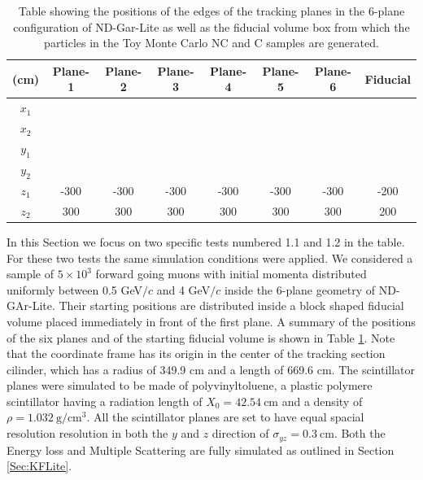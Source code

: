 \begin{table}[t]
    \centering
    \begin{tabular}{||c|c|c|c|c|c|c|c||}
        \hline
        (cm) &  Plane-1&  Plane-2&  Plane-3&  Plane-4&  Plane-5&  Plane-6& Fiducial\\
        \hline
        \hline
        $x_1$ &  &  &  &  &  &  & \\
        \hline
        $x_2$ &  &  &  &  &  &  & \\
        \hline
        $y_1$ &  &  &  &  &  &  & \\
        \hline
        $y_2$ &  &  &  &  &  &  & \\
        \hline
        $z_1$ &  -300&  -300&  -300&  -300&  -300&  -300& -200\\
        \hline
        $z_2$ &  300&  300&  300&  300&  300&  300& 200\\
        \hline
    \end{tabular}
    \caption{Table showing the positions of the edges of the tracking planes in the 6-plane configuration of ND-Gar-Lite as well as the fiducial volume box from which the particles in the Toy Monte Carlo NC and C samples are generated. }
    \label{tab:Lite dimentions}
\end{table}

In this Section we focus on two specific tests numbered 1.1 and 1.2 in the table. For these two tests the same simulation conditions were applied. We considered a sample of $5\times10^3$ forward going muons with initial momenta distributed uniformly between 0.5 GeV$/c$ and 4 GeV$/c$ inside the 6-plane geometry of ND-GAr-Lite. Their starting positions are distributed inside a block shaped fiducial volume placed immediately in front of the first plane. A summary of the positions of the six planes and of the starting fiducial volume is shown in Table \ref{tab:Lite dimentions}. Note that the coordinate frame has its origin in the center of the tracking section cilinder, which has a radius of 349.9 cm and a length of 669.6 cm. The scintillator planes were simulated to be made of polyvinyltoluene, a plastic polymere scintillator having a radiation length of $X_0 = 42.54 \ \text{cm}$ and a density of $\rho = 1.032 \ \text{g}/\text{cm}^3$. All the scintillator planes are set to have equal spacial resolution resolution in both the $y$ and $z$ direction of $\sigma_{yz} = 0.3 \ \text{cm}$. Both the Energy loss and Multiple Scattering are fully simulated as outlined in Section \ref{Sec:KFLite}. 

